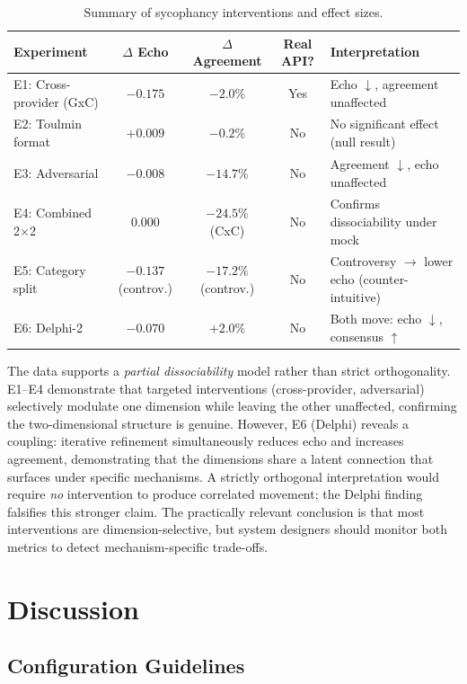 \documentclass[11pt]{article}
\begin{document}
\begin{table}[h]
\centering
\caption{Summary of sycophancy interventions and effect sizes.}
\label{tab:summary}
\begin{tabular}{lcccl}
\toprule
Experiment & $\Delta$ Echo & $\Delta$ Agreement & Real API? & Interpretation \\
\midrule
E1: Cross-provider (GxC) & $\mathbf{-0.175}$ & $-2.0\%$ & Yes & Echo $\downarrow$, agreement unaffected \\
E2: Toulmin format & $+0.009$ & $-0.2\%$ & No & No significant effect (null result) \\
E3: Adversarial & $-0.008$ & $\mathbf{-14.7\%}$ & No & Agreement $\downarrow$, echo unaffected \\
E4: Combined 2$\times$2 & $0.000$ & $-24.5\%$ (CxC) & No & Confirms dissociability under mock \\
E5: Category split & $-0.137$ (controv.) & $-17.2\%$ (controv.) & No & Controversy $\to$ lower echo (counter-intuitive) \\
E6: Delphi-2 & $-0.070$ & $+2.0\%$ & No & Both move: echo $\downarrow$, consensus $\uparrow$ \\
\bottomrule
\end{tabular}
\end{table}

\noindent The data supports a \textit{partial dissociability} model rather than strict orthogonality. E1--E4 demonstrate that targeted interventions (cross-provider, adversarial) selectively modulate one dimension while leaving the other unaffected, confirming the two-dimensional structure is genuine. However, E6 (Delphi) reveals a coupling: iterative refinement simultaneously reduces echo and increases agreement, demonstrating that the dimensions share a latent connection that surfaces under specific mechanisms. A strictly orthogonal interpretation would require \textit{no} intervention to produce correlated movement; the Delphi finding falsifies this stronger claim. The practically relevant conclusion is that most interventions are dimension-selective, but system designers should monitor both metrics to detect mechanism-specific trade-offs.

\section{Discussion}
\label{sec:discussion}

\subsection{Configuration Guidelines}
\end{document}
